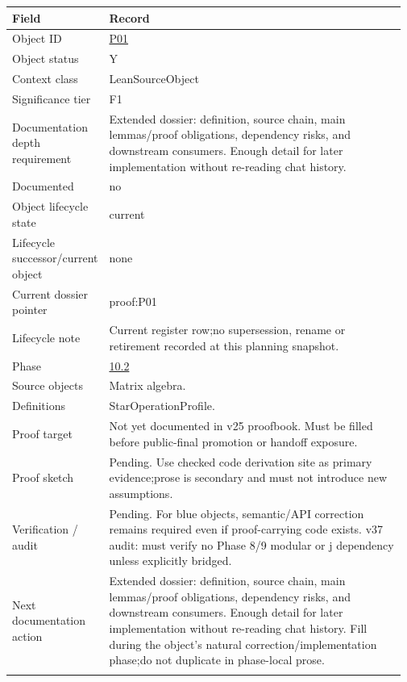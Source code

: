 \begin{longtable}{L{0.16\linewidth} L{0.81\linewidth}}
\hline
\textbf{Field} & \textbf{Record}\\
\hline
Object ID & \hyperlink{object-row-P01}{P01}\\
\hline\addlinespace[0.20em]
Object status & Y\\
\hline\addlinespace[0.20em]
Context class & LeanSourceObject\\
\hline\addlinespace[0.20em]
Significance tier & F1\\
\hline\addlinespace[0.20em]
Documentation depth requirement & Extended dossier: definition, source chain, main lemmas/\allowbreak{}proof obligations, dependency risks, and downstream consumers. Enough detail for later implementation without re-reading chat history.\\
\hline\addlinespace[0.20em]
Documented & no\\
\hline\addlinespace[0.20em]
Object lifecycle state & current\\
\hline\addlinespace[0.20em]
Lifecycle successor/\allowbreak{}current object & none\\
\hline\addlinespace[0.20em]
Current dossier pointer & proof:P01\\
\hline\addlinespace[0.20em]
Lifecycle note & Current register row;\newline no supersession, rename or retirement recorded at this planning snapshot.\\
\hline\addlinespace[0.20em]
Phase & \hyperlink{phase-row-10-2}{10.2}\\
\hline\addlinespace[0.20em]
Source objects & Matrix algebra.\\
\hline\addlinespace[0.20em]
Definitions & StarOperationProfile.\\
\hline\addlinespace[0.20em]
Proof target & Not yet documented in v25 proofbook. Must be filled before public-final promotion or handoff exposure.\\
\hline\addlinespace[0.20em]
Proof sketch & Pending. Use checked code derivation site as primary evidence;\newline prose is secondary and must not introduce new assumptions.\\
\hline\addlinespace[0.20em]
Verification /\allowbreak{} audit & Pending. For blue objects, semantic/\allowbreak{}API correction remains required even if proof-carrying code exists. v37 audit: must verify no Phase 8/\allowbreak{}9 modular or j dependency unless explicitly bridged.\\
\hline\addlinespace[0.20em]
Next documentation action & Extended dossier: definition, source chain, main lemmas/\allowbreak{}proof obligations, dependency risks, and downstream consumers. Enough detail for later implementation without re-reading chat history. Fill during the object's natural correction/\allowbreak{}implementation phase;\newline do not duplicate in phase-local prose.\\
\hline\addlinespace[0.20em]
\end{longtable}
